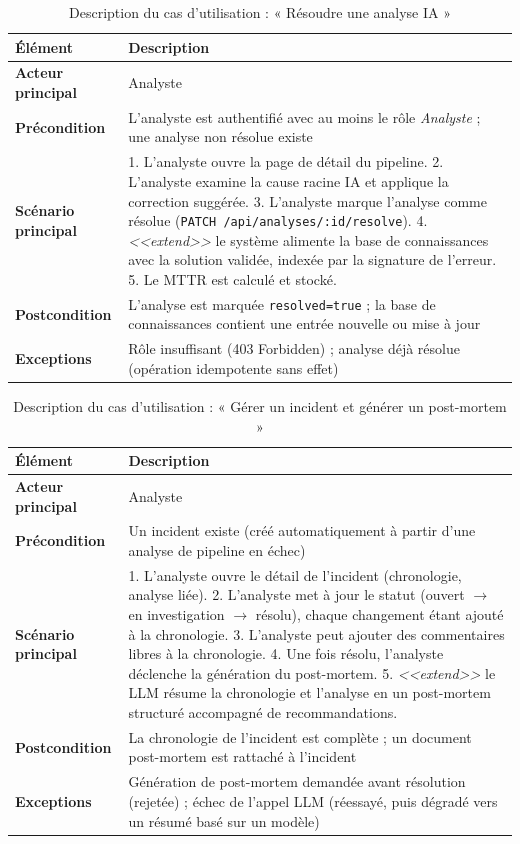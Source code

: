 \documentclass[12pt,a4paper,oneside]{report}
\begin{document}
\begin{table}[H]\centering
\caption{Description du cas d'utilisation : « Résoudre une analyse IA »}\label{tab:uc2}
\renewcommand{\arraystretch}{1.3}
\begin{tabularx}{\textwidth}{>{\bfseries\color{primary}}p{3.2cm} Y}
\toprule
{} Élément & Description \\
\midrule
Acteur principal & Analyste \\
Précondition & L'analyste est authentifié avec au moins le rôle \emph{Analyste} ; une analyse non résolue existe \\
Scénario principal & 1. L'analyste ouvre la page de détail du pipeline. 2. L'analyste examine la cause racine IA et applique la correction suggérée. 3. L'analyste marque l'analyse comme résolue (\texttt{PATCH /api/analyses/:id/resolve}). 4. \emph{<<extend>>} le système alimente la base de connaissances avec la solution validée, indexée par la signature de l'erreur. 5. Le MTTR est calculé et stocké. \\
Postcondition & L'analyse est marquée \texttt{resolved=true} ; la base de connaissances contient une entrée nouvelle ou mise à jour \\
Exceptions & Rôle insuffisant (403 Forbidden) ; analyse déjà résolue (opération idempotente sans effet) \\
\bottomrule
\end{tabularx}
\end{table}

\begin{table}[H]\centering
\caption{Description du cas d'utilisation : « Gérer un incident et générer un post-mortem »}\label{tab:uc3}
\renewcommand{\arraystretch}{1.3}
\begin{tabularx}{\textwidth}{>{\bfseries\color{primary}}p{3.2cm} Y}
\toprule
{} Élément & Description \\
\midrule
Acteur principal & Analyste \\
Précondition & Un incident existe (créé automatiquement à partir d'une analyse de pipeline en échec) \\
Scénario principal & 1. L'analyste ouvre le détail de l'incident (chronologie, analyse liée). 2. L'analyste met à jour le statut (ouvert $\rightarrow$ en investigation $\rightarrow$ résolu), chaque changement étant ajouté à la chronologie. 3. L'analyste peut ajouter des commentaires libres à la chronologie. 4. Une fois résolu, l'analyste déclenche la génération du post-mortem. 5. \emph{<<extend>>} le LLM résume la chronologie et l'analyse en un post-mortem structuré accompagné de recommandations. \\
Postcondition & La chronologie de l'incident est complète ; un document post-mortem est rattaché à l'incident \\
Exceptions & Génération de post-mortem demandée avant résolution (rejetée) ; échec de l'appel LLM (réessayé, puis dégradé vers un résumé basé sur un modèle) \\
\bottomrule
\end{tabularx}
\end{table}
\end{document}
